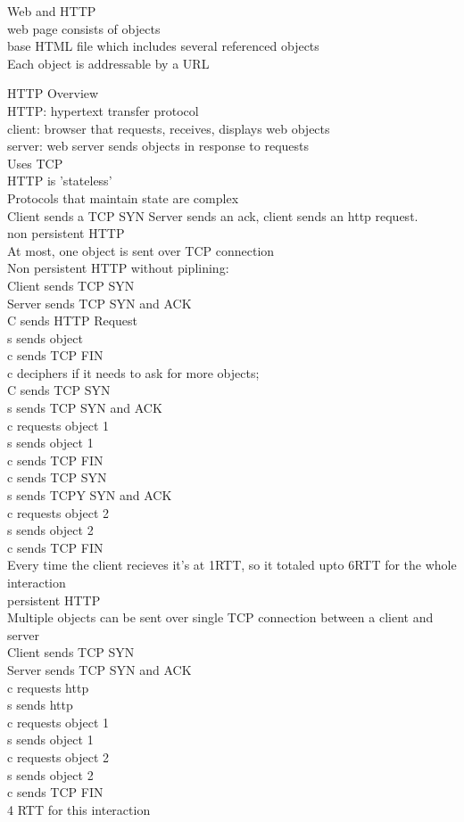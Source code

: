Web and HTTP\\
{\color{blue} web page} consists of objects\\
{\color{blue} base HTML file} which includes several referenced objects\\
Each object is addressable by a {\color{blue} URL}

HTTP Overview\\
HTTP: hypertext transfer protocol\\
{\color{blue} client}: browser that requests, receives, displays web objects\\
{\color{blue} server}: web server sends objects in response to requests\\
Uses TCP\\
HTTP is 'stateless'\\
\arr Protocols that maintain state are complex\\
Client sends a TCP SYN  Server sends an ack, client sends an http request.\\
non persistent HTTP\\
At most, one object is sent over TCP connection\\

Non persistent HTTP without piplining:\\
Client sends TCP SYN\\
Server sends TCP SYN and ACK\\
C sends HTTP Request\\
s sends object\\
c sends TCP FIN\\
c deciphers if it needs to ask for more objects;\\
C sends TCP SYN\\
s sends TCP SYN and ACK\\
c requests object 1\\
s sends object 1\\
c sends TCP FIN\\
c sends TCP SYN\\
s sends TCPY SYN and ACK\\
c requests object 2\\
s sends object 2\\
c sends TCP FIN\\
Every time the client recieves it's at 1RTT, so it totaled upto 6RTT for the whole interaction\\


persistent HTTP\\
Multiple objects can be sent over single TCP connection between a client and server\\
Client sends TCP SYN\\
Server sends TCP SYN and ACK\\
c requests http\\
s sends http\\
c requests object 1\\
s sends object 1\\
c requests object 2\\
s sends object 2\\
c sends TCP FIN\\
4 RTT for this interaction\\


